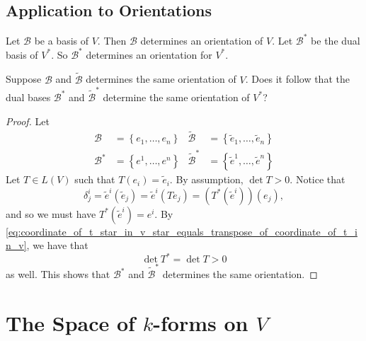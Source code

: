 \documentclass[notoc,notitlepage]{tufte-book}
\begin{document}
\subsection{Application to Orientations}%
\label{sub:application_to_orientations}

Let $\mathcal{B}$ be a basis of $V$. Then $\mathcal{B}$ determines an
orientation of $V$. Let $\mathcal{B}^*$ be the dual basis of $V^*$.
So $\mathcal{B}^*$ determines an orientation for $V^*$.

\begin{eg}
  Suppose $\mathcal{B}$ and $\tilde{\mathcal{B}}$ determines the same
  orientation of $V$. Does it follow that the dual bases $\mathcal{B}^*$
  and $\tilde{\mathcal{B}}^*$ determine the same orientation of $V^*$?
\end{eg}

\begin{proof}
  Let
  \begin{align*}
    \mathcal{B} &= \left\{ e_1, \ldots, e_n \right\} &
    \tilde{\mathcal{B}} &= \left\{ \tilde{e}_1, \ldots, \tilde{e}_n \right\} \\
    \mathcal{B}^* &= \left\{ e^1, \ldots, e^n \right\} &
    \tilde{\mathcal{B}}^* &= \left\{ \tilde{e}^1, \ldots, \tilde{e}^n \right\}
  \end{align*}
  Let $T \in L(V)$ such that $T(e_i) = \tilde{e}_i$. By assumption, $\det T > 0$.
  Notice that
  \begin{equation*}
    \delta_j^i = \tilde{e}^i (\tilde{e}_j) = \tilde{e}^i ( Te_j ) = (T^*(\tilde{e}^i))(e_j),
  \end{equation*}
  and so we must have $T^*(\tilde{e}^i) = e^i$. By
  \cref{eq:coordinate_of_t_star_in_v_star_equals_transpose_of_coordinate_of_t_in_v},
  we have that
  \begin{equation*}
    \det T^* = \det T > 0
  \end{equation*}
  as well. This shows that $\mathcal{B}^*$ and $\tilde{\mathcal{B}}^*$ determines
  the same orientation.
\end{proof}



\section{The Space of \texorpdfstring{$k$}{k}-forms on \texorpdfstring{$V$}{V}}%
\label{sec:the_space_of_k_forms_on_v_}
\end{document}
